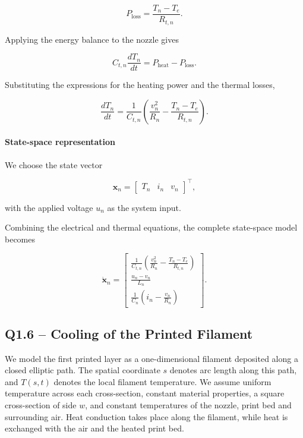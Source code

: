 \documentclass[a4paper,12pt]{article}
\begin{document}
\begin{equation}
P_{\mathrm{loss}}=\frac{T_n-T_e}{R_{t,n}}.
\end{equation}

Applying the energy balance to the nozzle gives

\begin{equation}
C_{t,n}\frac{dT_n}{dt}
=P_{\mathrm{heat}}-P_{\mathrm{loss}}.
\end{equation}

Substituting the expressions for the heating power and the thermal losses,

\begin{equation}
\frac{dT_n}{dt}
=\frac{1}{C_{t,n}}
\left(
\frac{v_n^2}{R_n}
-\frac{T_n-T_e}{R_{t,n}}
\right).
\end{equation}

\paragraph{State-space representation}

We choose the state vector

\begin{equation}
\mathbf{x}_n=
\begin{bmatrix}
T_n & i_n & v_n
\end{bmatrix}^{\top},
\end{equation}

with the applied voltage $u_n$ as the system input.

Combining the electrical and thermal equations, the complete state-space model becomes

\begin{equation}
\boxed{
\dot{\mathbf{x}}_n=
\begin{bmatrix}
\displaystyle
\frac{1}{C_{t,n}}
\left(
\frac{v_n^2}{R_n}
-\frac{T_n-T_e}{R_{t,n}}
\right)\\[12pt]
\displaystyle
\frac{u_n-v_n}{L_n}\\[10pt]
\displaystyle
\frac{1}{C_n}
\left(i_n-\frac{v_n}{R_n}\right)
\end{bmatrix}.
}
\end{equation}


\subsection*{Q1.6 -- Cooling of the Printed Filament}

We model the first printed layer as a one-dimensional filament deposited along a closed elliptic path. The spatial coordinate $s$ denotes arc length along this path, and $T(s,t)$ denotes the local filament temperature. We assume uniform temperature across each cross-section, constant material properties, a square cross-section of side $w$, and constant temperatures of the nozzle, print bed and surrounding air. Heat conduction takes place along the filament, while heat is exchanged with the air and the heated print bed.
\end{document}
